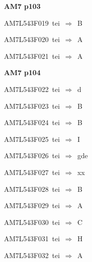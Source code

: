 \par\vfill\eject
{\bf\hfill AM7 p103\hfill\hbox{}}\par\bigskip
{\sixrm AM7L543F019\ {\sixit tei}\ }$\Rightarrow$\ B\par\smallskip
{\sixrm AM7L543F020\ {\sixit tei}\ }$\Rightarrow$\ A\par\smallskip
{\sixrm AM7L543F021\ {\sixit tei}\ }$\Rightarrow$\ A\par\smallskip

\par\vfill\eject
{\bf\hfill AM7 p104\hfill\hbox{}}\par\bigskip
{\sixrm AM7L543F022\ {\sixit tei}\ }$\Rightarrow$\ {\tenit d}\par\smallskip
{\sixrm AM7L543F023\ {\sixit tei}\ }$\Rightarrow$\ B\par\smallskip
{\sixrm AM7L543F024\ {\sixit tei}\ }$\Rightarrow$\ B\par\smallskip
{\sixrm AM7L543F025\ {\sixit tei}\ }$\Rightarrow$\ I\par\smallskip
{\sixrm AM7L543F026\ {\sixit tei}\ }$\Rightarrow$\ {\tenit gde}\par\smallskip
{\sixrm AM7L543F027\ {\sixit tei}\ }$\Rightarrow$\ {\tenit xx}\par\smallskip
{\sixrm AM7L543F028\ {\sixit tei}\ }$\Rightarrow$\ B\par\smallskip
{\sixrm AM7L543F029\ {\sixit tei}\ }$\Rightarrow$\ A\par\smallskip
{\sixrm AM7L543F030\ {\sixit tei}\ }$\Rightarrow$\ C\par\smallskip
{\sixrm AM7L543F031\ {\sixit tei}\ }$\Rightarrow$\ H\par\smallskip
{\sixrm AM7L543F032\ {\sixit tei}\ }$\Rightarrow$\ A\par\smallskip

